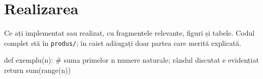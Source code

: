 \chapter{Realizarea}
Ce ați implementat sau realizat, cu fragmentele relevante, figuri și tabele. Codul complet stă în \texttt{produs/};
în caiet adăugați doar partea care merită explicată.

\begin{cod}[highlightlines={2}]
def exemplu(n):
    # suma primelor n numere naturale; rândul discutat e evidențiat
    return sum(range(n))
\end{cod}
